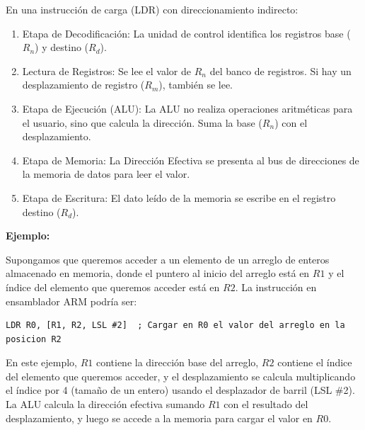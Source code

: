 \documentclass[letterpaper,12pt]{article}
\begin{document}
    En una instrucción de carga (LDR) con direccionamiento indirecto:

    \begin{enumerate}
        \item Etapa de Decodificación: La unidad de control identifica los registros base ($R_n$) y destino ($R_d$).
        \item Lectura de Registros: Se lee el valor de $R_n$ del banco de registros. Si hay un desplazamiento de registro ($R_m$), también se lee.
        \item Etapa de Ejecución (ALU): La ALU no realiza operaciones aritméticas para el usuario, sino que calcula la dirección. Suma la base ($R_n$) con el desplazamiento.
        \item Etapa de Memoria: La Dirección Efectiva se presenta al bus de direcciones de la memoria de datos para leer el valor.
        \item Etapa de Escritura: El dato leído de la memoria se escribe en el registro destino ($R_d$).
    \end{enumerate}

    \newpage

    \textbf{Ejemplo:}
    
    Supongamos que queremos acceder a un elemento de un arreglo de enteros almacenado en memoria, donde el puntero al inicio del arreglo está en $R1$ y el índice del elemento que queremos acceder está en $R2$. La instrucción en ensamblador ARM podría ser:
    \begin{lstlisting}[language={[x86masm]Assembler}, caption={Ejemplo de direccionamiento indirecto con desplazamiento de registro}]
        LDR R0, [R1, R2, LSL #2]  ; Cargar en R0 el valor del arreglo en la posicion R2
    \end{lstlisting}
    En este ejemplo, $R1$ contiene la dirección base del arreglo, $R2$ contiene el índice del elemento que queremos acceder, y el desplazamiento se calcula multiplicando el índice por 4 (tamaño de un entero) usando el desplazador de barril (LSL \#2). La ALU calcula la dirección efectiva sumando $R1$ con el resultado del desplazamiento, y luego se accede a la memoria para cargar el valor en $R0$.
\end{document}

